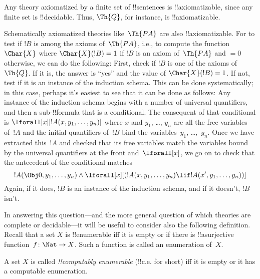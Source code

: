 \documentclass[../../../include/open-logic-section]{subfiles}
\begin{document}
\begin{ex}
Any theory axiomatized by a finite set of !!{sentence}s is
!!{axiomatizable}, since any finite set is !!{decidable}.
Thus, $\Th{Q}$, for instance, is !!{axiomatizable}.

Schematically axiomatized theories like~$\Th{PA}$ are also
!!{axiomatizable}. For to test if $!B$ is among the axioms
of~$\Th{PA}$, i.e., to compute the function $\Char{X}$ where
$\Char{X}(!B) = 1$ if $!B$ is an axiom of~$\Th{PA}$ and $= 0$
otherwise, we can do the following: First, check if $!B$ is one of the
axioms of~$\Th{Q}$. If it is, the answer is ``yes'' and the value of
$\Char{X}(!B) = 1$. If not, test if it is an instance of the induction
schema.  This can be done systematically; in this case, perhaps it's
easiest to see that it can be done as follows: Any instance of the
induction schema begins with a number of universal quantifiers, and
then a sub-!!{formula} that is a conditional. The consequent of that
conditional is $\lforall[x][!A(x, y_1, \dots, y_n)]$ where $x$ and
$y_1$, \dots, $y_n$ are all the free variables of~$!A$ and the initial
quantifiers of~$!B$ bind the variables~$y_1$, \dots,~$y_n$.  Once we
have extracted this~$!A$ and checked that its free variables match the
variables bound by the universal quantifiers at the front
and~$\lforall[x]$, we go on to check that the antecedent of the
conditional matches
\[
!A(\Obj 0, y_1, \dots, y_n) \land \lforall[x][(!A(x, y_1, \dots, y_n)
\lif !A(x', y_1, \dots, y_n))]
\]
Again, if it does, $!B$ is an instance of the induction schema, and if
it doesn't, $!B$ isn't.
\end{ex}

In answering this question---and the more general question of which
theories are complete or decidable---it will be useful to consider
also the following definition. Recall that a set $X$ is !!{enumerable}
iff it is empty or if there is !!a{surjective} function~$f \colon \Nat
\to X$. Such a function is called an enumeration of~$X$.

\begin{defn}
A set $X$ is called \emph{!!{computably enumerable}} (!!{c.e.} for
short) iff it is empty or it has a computable enumeration.
\end{defn}
\end{document}
